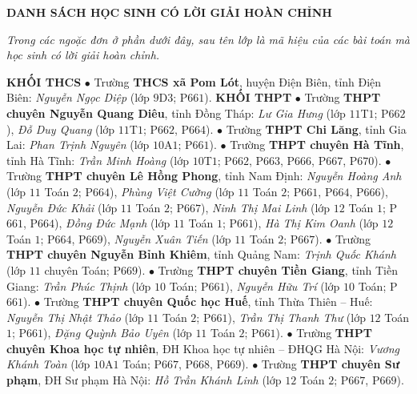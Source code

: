 {\centerline{\textbf{\color{thachthuctoanhoc}DANH SÁCH HỌC SINH CÓ LỜI GIẢI HOÀN CHỈNH}}}
\vskip 0.05cm
\textit{Trong các ngoặc đơn ở phần dưới đây, sau tên lớp là mã hiệu của các bài toán mà học sinh có lời giải hoàn chỉnh.}
\begin{multicols}{2}
	\textbf{\color{thachthuctoanhoc}KHỐI THCS}
	\vskip 0.05cm
	$\bullet$ Trường \textbf{\color{thachthuctoanhoc}THCS xã Pom Lót}, huyện Điện Biên, tỉnh Điện Biên: \textit{Nguyễn Ngọc Diệp} (lớp $9$D$3$; P$661$).
	\vskip 0.05cm
	\textbf{\color{thachthuctoanhoc}KHỐI THPT}
	\vskip 0.05cm
	$\bullet$ Trường \textbf{\color{thachthuctoanhoc}THPT chuyên Nguyễn Quang Diêu}, tỉnh Đồng Tháp: \textit{Lư Gia Hưng} (lớp $11$T$1$; P$662$), \textit{Đỗ Duy Quang} (lớp $11$T$1$; P$662$, P$664$).
	\vskip 0.05cm
	$\bullet$ Trường \textbf{\color{thachthuctoanhoc}THPT Chi Lăng}, tỉnh Gia Lai: \textit{Phan Trịnh Nguyên} (lớp $10$A$1$; P$661$).
	\vskip 0.05cm
	$\bullet$ Trường \textbf{\color{thachthuctoanhoc}THPT chuyên Hà Tĩnh}, tỉnh Hà Tĩnh: \textit{Trần Minh Hoàng} (lớp $10$T$1$; P$662$, P$663$, P$666$, P$667$, P$670$).
	\vskip 0.05cm
	$\bullet$ Trường \textbf{\color{thachthuctoanhoc}THPT chuyên Lê Hồng Phong}, tỉnh Nam Định: \textit{Nguyễn Hoàng Anh} (lớp $11$ Toán $2$; P$664$), \textit{Phùng Việt Cường} (lớp $11$ Toán $2$; P$661$, P$664$, P$666$), \textit{Nguyễn Đức Khải} (lớp $11$ Toán $2$; P$667$), \textit{Ninh Thị Mai Linh} (lớp $12$ Toán $1$; P$661$, P$664$), \textit{Đồng Đức Mạnh} (lớp $11$ Toán $1$; P$661$), \textit{Hà Thị Kim Oanh} (lớp $12$ Toán $1$; P$664$, P$669$), \textit{Nguyễn Xuân Tiến} (lớp $11$ Toán $2$; P$667$).
	\vskip 0.05cm
	$\bullet$ Trường \textbf{\color{thachthuctoanhoc}THPT chuyên Nguyễn Bỉnh Khiêm}, tỉnh Quảng Nam: \textit{Trịnh Quốc Khánh} (lớp $11$ chuyên Toán; P$669$).
	\vskip 0.05cm
	$\bullet$ Trường \textbf{\color{thachthuctoanhoc}THPT chuyên Tiền Giang}, tỉnh Tiền Giang: \textit{Trần Phúc Thịnh} (lớp $10$ Toán; P$661$), \textit{Nguyễn Hữu Trí} (lớp $10$ Toán; P$661$).
	\vskip 0.05cm
	$\bullet$ Trường \textbf{\color{thachthuctoanhoc}THPT chuyên Quốc học Huế}, tỉnh Thừa Thiên -- Huế: \textit{Nguyễn Thị Nhật Thảo} (lớp $11$ Toán $2$; P$661$), \textit{Trần Thị Thanh Thư} (lớp $12$ Toán $1$; P$661$), \textit{Đặng Quỳnh Bảo Uyên} (lớp $11$ Toán $2$; P$661$).
	\vskip 0.05cm
	$\bullet$ Trường \textbf{\color{thachthuctoanhoc}THPT chuyên Khoa học tự nhiên}, ĐH Khoa học tự nhiên -- ĐHQG Hà Nội: \textit{Vương Khánh Toàn} (lớp $10$A$1$ Toán; P$667$, P$668$, P$669$).
	\vskip 0.05cm
	$\bullet$ Trường \textbf{\color{thachthuctoanhoc}THPT chuyên Sư phạm}, ĐH Sư phạm Hà Nội: \textit{Hồ Trần Khánh Linh} (lớp $12$ Toán $2$; P$667$, P$669$).
\end{multicols}
